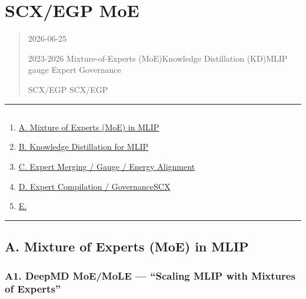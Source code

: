 \documentclass[
  12pt,
]{article}
\author{SCX}
\date{2026}
\providecommand{\tightlist}{%
  \setlength{\itemsep}{0pt}\setlength{\parskip}{0pt}}
\begin{document}
\section{SCX/EGP MoE
}\label{scxegp-ux7adeux4e89ux5206ux6790ux62a5ux544amoe-ux67b6ux6784ux84b8ux998fux4e0eux4e13ux5bb6ux6cbbux7406}

\begin{quote}
2026-06-25

2023-2026  Mixture-of-Experts (MoE)Knowledge
Distillation (KD)MLIP gauge Expert
Governance

 SCX/EGP  SCX/EGP

\end{quote}

\begin{center}\rule{0.5\linewidth}{0.5pt}\end{center}

\subsection{}\label{ux76eeux5f55}

\begin{enumerate}
\def\labelenumi{\arabic{enumi}.}
\tightlist
\item
  \hyperref[a-mixture-of-experts-moe-in-mlip]{A. Mixture of Experts
  (MoE) in MLIP}
\item
  \hyperref[b-knowledge-distillation-for-mlip]{B. Knowledge Distillation
  for MLIP}
\item
  \hyperref[c-expert-merging--gauge--energy-alignment]{C. Expert Merging
  / Gauge / Energy Alignment}
\item
  \hyperref[d-expert-compilation--governancescx-ux6838ux5fc3ux521bux65b0ux533a]{D.
  Expert Compilation / GovernanceSCX }
\item
  \hyperref[e-ux7adeux4e89ux683cux5c40ux603bux7ed3ux4e0eux6218ux7565ux5efaux8bae]{E.
  }
\end{enumerate}

\begin{center}\rule{0.5\linewidth}{0.5pt}\end{center}

\subsection{A. Mixture of Experts (MoE) in
MLIP}\label{a.-mixture-of-experts-moe-in-mlip}

\subsubsection{A1. DeepMD MoE/MoLE --- ``Scaling MLIP with Mixtures of
Experts''}\label{a1.-deepmd-moemole-scaling-mlip-with-mixtures-of-experts}
\end{document}
